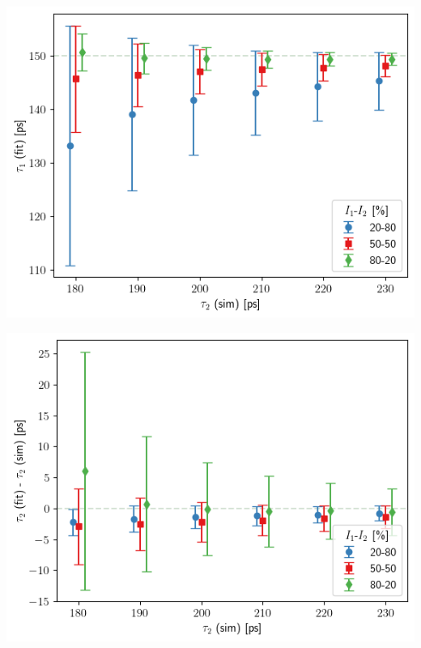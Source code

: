 {\begin{minipage}{ .47\linewidth}
    \includegraphics[width=\linewidth]{Batch 3/single Gaussian IRF/gauss210/150/output/plotfin/t1.png}
    \label{fig:1g-t1}
\end{minipage}
\hfill
\begin{minipage}{ .47\linewidth}
    \includegraphics[width=\linewidth]{Batch 3/single Gaussian IRF/gauss210/150/output/plotfin/t2.png}
    \label{fig:1g-t2}
\end{minipage}
\begin{minipage}{ .47\linewidth}

\end{minipage}}
